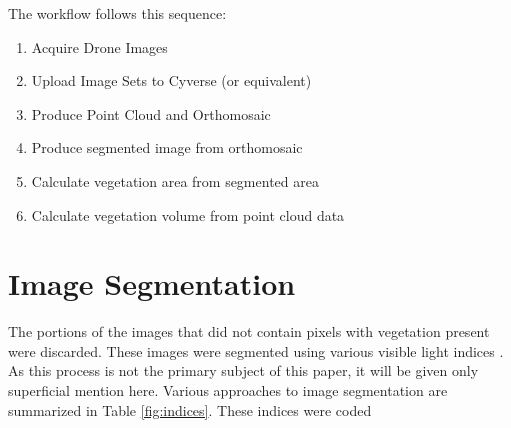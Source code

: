 \documentclass[letterpaper]{article}
\begin{document}
The workflow follows this sequence:
\begin{enumerate}
	\item Acquire Drone Images
	\item Upload Image Sets to Cyverse (or equivalent)
	\item Produce Point Cloud and Orthomosaic
	\item Produce segmented image from orthomosaic
	\item Calculate vegetation area from segmented area
	\item Calculate vegetation volume from point cloud data
\end{enumerate}

%
%
\section{Image Segmentation}
The portions of the images that did not contain pixels with vegetation present were discarded. These images were segmented using various visible light indices \cite{Hamuda2016-dw}. As this process is not the primary subject of this paper, it will be given only superficial mention here.  Various approaches to image segmentation are  summarized in Table \ref{fig:indices}. These indices were coded
\end{document}
